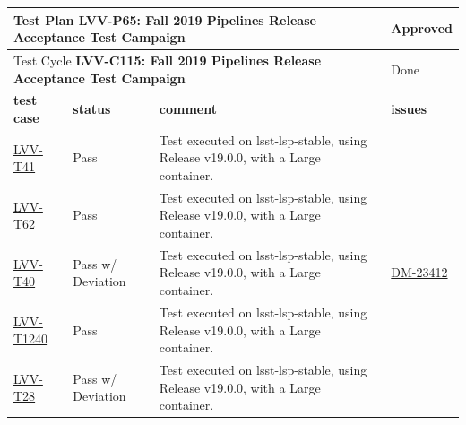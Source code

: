 \documentclass[DM,lsstdraft,STR,toc]{lsstdoc}
\begin{document}
\begin{longtable}{p{2cm}p{2.5cm}p{9cm}p{2.5cm}}
\toprule
\multicolumn{3}{l}{ Test Plan {\bf LVV-P65:  Fall 2019 Pipelines Release Acceptance Test Campaign
 }} & Approved \\\hline

  \multicolumn{3}{l}{ Test Cycle {\bf LVV-C115:  Fall 2019 Pipelines Release Acceptance Test Campaign
 }} & Done \\\hline

  {\bf \footnotesize test case} & {\bf \footnotesize status} & {\bf \footnotesize comment} & {\bf \footnotesize issues} \\\toprule

\href{https://jira.lsstcorp.org/secure/Tests.jspa#/testCase/LVV-T41}{LVV-T41}
    & Pass &
    \begin{minipage}[]{9cm}
    \smallskip
     Test executed on lsst-lsp-stable, using Release v19.0.0, with a Large
container.

    \medskip
    \end{minipage}
    &
    \\\hline
\href{https://jira.lsstcorp.org/secure/Tests.jspa#/testCase/LVV-T62}{LVV-T62}
    & Pass &
    \begin{minipage}[]{9cm}
    \smallskip
     Test executed on lsst-lsp-stable, using Release v19.0.0, with a Large
container.

    \medskip
    \end{minipage}
    &
    \\\hline
\href{https://jira.lsstcorp.org/secure/Tests.jspa#/testCase/LVV-T40}{LVV-T40}
    & Pass w/ Deviation &
    \begin{minipage}[]{9cm}
    \smallskip
     Test executed on lsst-lsp-stable, using Release v19.0.0, with a Large
container.

    \medskip
    \end{minipage}
    &
          \href{https://jira.lsstcorp.org/browse/DM-23412}{DM-23412}
    \\\hline
\href{https://jira.lsstcorp.org/secure/Tests.jspa#/testCase/LVV-T1240}{LVV-T1240}
    & Pass &
    \begin{minipage}[]{9cm}
    \smallskip
     Test executed on lsst-lsp-stable, using Release v19.0.0, with a Large
container.

    \medskip
    \end{minipage}
    &
    \\\hline
\href{https://jira.lsstcorp.org/secure/Tests.jspa#/testCase/LVV-T28}{LVV-T28}
    & Pass w/ Deviation &
    \begin{minipage}[]{9cm}
    \smallskip
     Test executed on lsst-lsp-stable, using Release v19.0.0, with a Large
container.


\end{minipage}
\end{longtable}
\end{document}

